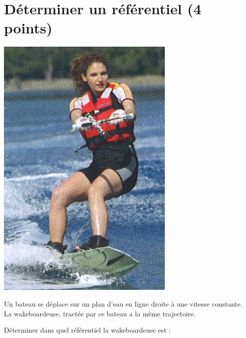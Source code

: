 \section{Déterminer un référentiel (4 points)}

\begin{center}
	\includegraphics[scale=0.3]{board}
\end{center}

Un bateau se déplace sur un plan d'eau en ligne droite à une vitesse constante.
La wakeboardeuse, tractée par ce bateau a la même trajectoire.
\begin{questions}
	\question Déterminer dans quel référentiel la wakeboardeuse est :
	
\end{questions}